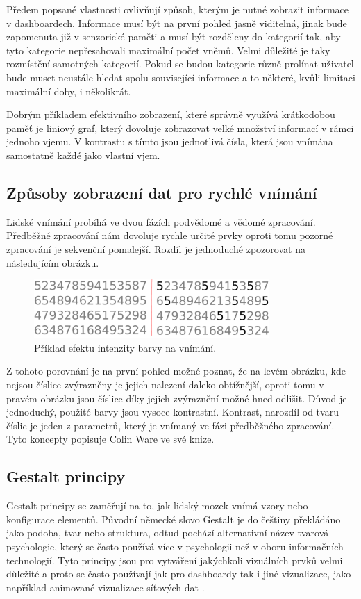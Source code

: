 Předem popsané vlastnosti ovlivňují způsob, kterým je nutné zobrazit informace v dashboardech. Informace musí být na první pohled jasně viditelná, jinak bude zapomenuta již v senzorické paměti a musí být rozděleny do kategorií tak, aby tyto kategorie nepřesahovali maximální počet vněmů. Velmi důležité je taky rozmístění samotných kategorií. Pokud se budou kategorie různě prolínat uživatel bude muset neustále hledat spolu související informace a to některé, kvůli limitaci maximální doby, i několikrát. 

Dobrým příkladem efektivního zobrazení, které správně využívá krátkodobou paměť je liniový graf, který dovoluje zobrazovat velké množství informací v rámci jednoho vjemu. V kontrastu s tímto jsou jednotlivá čísla, která jsou vnímána samostatně každé jako vlastní vjem.

\subsection{Způsoby zobrazení dat pro rychlé vnímání}
Lidské vnímání probíhá ve dvou fázích podvědomé a vědomé zpracování. Předběžné zpracování nám dovoluje rychle určité prvky oproti tomu pozorné zpracování je sekvenční pomalejší. Rozdíl je jednoduché zpozorovat na následujícím obrázku.

\begin{figure}[H]
\label{question4}
\begin{center}
    \includegraphics[width=0.8\textwidth]{obrazky-figures/fives.pdf}
\end{center}
\caption{Příklad efektu intenzity barvy na vnímání.}
\end{figure}

Z tohoto porovnání je na první pohled možné poznat, že na levém obrázku, kde nejsou číslice zvýrazněny je jejich nalezení daleko obtížnější, oproti tomu v pravém obrázku jsou číslice díky jejich zvýraznění možné hned odlišit. Důvod je jednoduchý, použité barvy jsou vysoce kontrastní. Kontrast, narozdíl od tvaru číslic je jeden z parametrů, který je vnímaný ve fázi předběžného zpracování. Tyto koncepty popisuje Colin Ware \cite{ware2012information} ve své knize.

\subsection{Gestalt principy}
Gestalt principy se zaměřují na to, jak lidský mozek vnímá vzory nebo konfigurace elementů. Původní německé slovo Gestalt je do češtiny překládáno jako podoba, tvar nebo struktura, odtud pochází alternativní název tvarová psychologie, který se často používá více v psychologii než v oboru informačních technologií. Tyto principy jsou pro vytváření jakýchkoli vizuálních prvků velmi důležité a proto se často používají jak pro dashboardy tak i jiné vizualizace, jako například animované vizualizace síťových dat \cite{1028859}.

